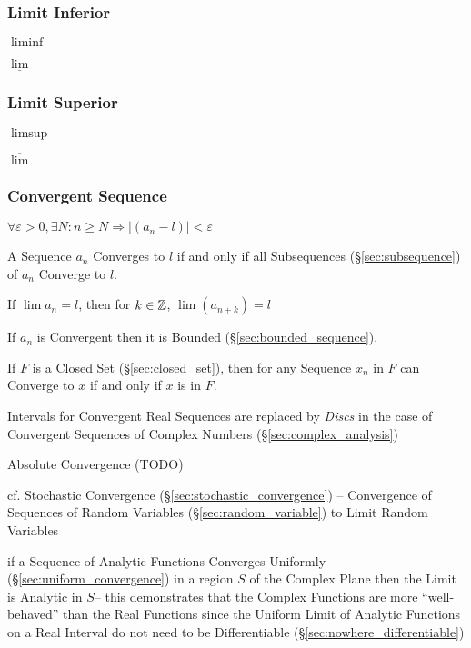 \subsubsection{Limit Inferior}\label{sec:liminf}

$\liminf$

$\underline{\lim}$



\subsubsection{Limit Superior}\label{sec:limsup}

$\limsup$

$\overline{\lim}$



\subsubsection{Convergent Sequence}\label{sec:convergent_sequence}

$\forall \varepsilon > 0, \exists N : n \geq N \Rightarrow |(a_n - l)| <
\varepsilon$

A Sequence $a_n$ Converges to $l$ if and only if all Subsequences
(\S\ref{sec:subsequence}) of $a_n$ Converge to $l$.

If $\lim a_n = l$, then for $k \in \mathbb{Z}$, $\lim (a_{n+k}) = l$

If $a_n$ is Convergent then it is Bounded
(\S\ref{sec:bounded_sequence}).

If $F$ is a Closed Set (\S\ref{sec:closed_set}), then for any Sequence
$x_n$ in $F$ can Converge to $x$ if and only if $x$ is in $F$.

Intervals for Convergent Real Sequences are replaced by \emph{Discs} in the
case of Convergent Sequences of Complex Numbers (\S\ref{sec:complex_analysis})

Absolute Convergence (TODO)

\fist cf. Stochastic Convergence (\S\ref{sec:stochastic_convergence}) --
Convergence of Sequences of Random Variables (\S\ref{sec:random_variable}) to
Limit Random Variables

if a Sequence of Analytic Functions Converges Uniformly
(\S\ref{sec:uniform_convergence}) in a region $S$ of the Complex Plane then the
Limit is Analytic in $S$-- this demonstrates that the Complex Functions are
more ``well-behaved'' than the Real Functions since the Uniform Limit of
Analytic Functions on a Real Interval do not need to be Differentiable
(\S\ref{sec:nowhere_differentiable})

